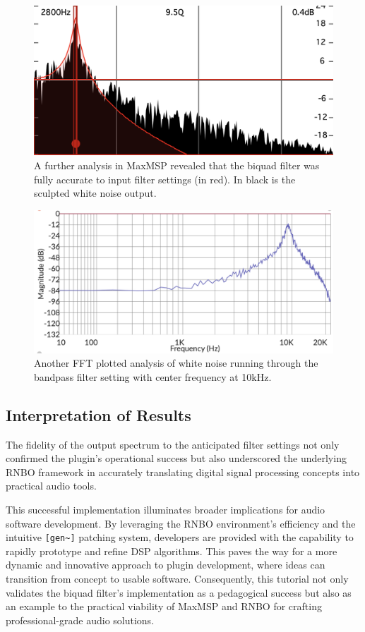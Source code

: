 \documentclass[10pt,twocolumn]{article}
\begin{document}
\begin{figure}[htbp]
  \centering
  \includegraphics[width=0.8\linewidth]{spectrum.png}
  \caption{A further analysis in MaxMSP revealed that the biquad filter was fully accurate to input filter settings (in red). In black is the sculpted white noise output.}
  \label{fig:spectrummax}
\end{figure}

\begin{figure}[htbp]
  \centering
  \includegraphics[width=0.8\linewidth]{fft2.png}
  \caption{Another FFT plotted analysis of white noise running through the bandpass filter setting with center frequency at 10kHz.}
  \label{fig:fft}
\end{figure}

\subsection{Interpretation of Results}
The fidelity of the output spectrum to the anticipated filter settings not only confirmed the plugin's operational success but also underscored the underlying RNBO framework in accurately translating digital signal processing concepts into practical audio tools.

This successful implementation illuminates broader implications for audio software development. By leveraging the RNBO environment's efficiency and the intuitive \verb|[gen~]| patching system, developers are provided with the capability to rapidly prototype and refine DSP algorithms. This paves the way for a more dynamic and innovative approach to plugin development, where ideas can transition from concept to usable software. Consequently, this tutorial not only validates the biquad filter's implementation as a pedagogical success but also as an example to the practical viability of MaxMSP and RNBO for crafting professional-grade audio solutions.
\end{document}
